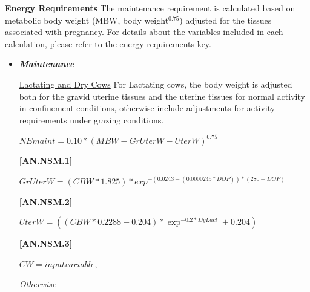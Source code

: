 \begin{refsection}
    \textbf{ Energy Requirements} 
    The maintenance requirement is calculated based on metabolic body weight (MBW, body weight\(^{0.75}\)) adjusted for the tissues associated with pregnancy. For details about the variables included in each calculation, please refer to the energy requirements key.
    \vspace{0.2cm}

\begin{itemize}
    \item \textbf{\textit{Maintenance}}
    \vspace{0.2cm}
    
        \underline {Lactating and Dry Cows}
        For Lactating cows, the body weight is adjusted both for the gravid uterine tissues and the uterine tissues for normal activity in confinement conditions, otherwise include adjustments for activity requirements under grazing conditions. 
        
        \vspace{0.25cm}
\begin{center}
    \(NEmaint = 0.10 * (MBW - GrUterW - UterW)^{0.75}\)
\end{center}
\vspace{0.5cm}
            {\raggedleft \textbf{[AN.NSM.1]}\par}
\vspace{0.25cm}

\begin{center}
    \(GrUterW = (CBW * 1.825) * exp^{-(0.0243 - (0.0000245 * DOP))*(280 - DOP)} \)
\end{center}
\vspace{0.5cm}
            {\raggedleft\textbf{[AN.NSM.2]} \par}
\vspace{0.25cm}

\begin{center}
    \(UterW = ((CBW * 0.2288 - 0.204) * \exp^{-0.2 * DyLact} + 0.204)\)
\end{center}
\vspace{0.5cm}
            {\raggedleft\textbf{[AN.NSM.3]} \par}
\vspace{0.25cm}

\begin{center}
    \(CW = inputvariable, \)
\end{center}
\vspace{0.5cm}

\textit{\small Otherwise}
\vspace{0.25cm}


\end{itemize}
\end{refsection}
